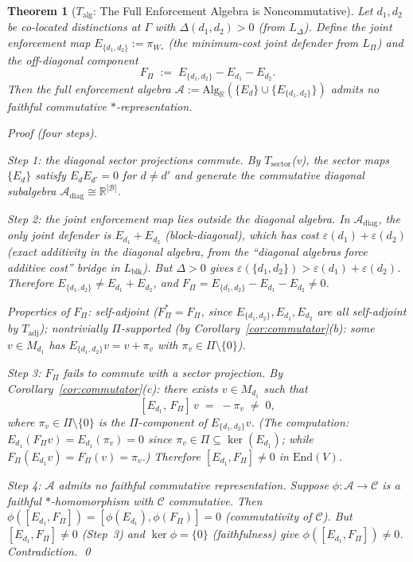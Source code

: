 \documentclass[11pt,a4paper]{article}
\newtheorem{theorem}{Theorem}[section]
\theoremstyle{definition}
\newcommand{\eps}{\varepsilon}
\newcommand{\End}{\mathrm{End}}
\begin{document}
\begin{theorem}[$T_{\mathrm{alg}}$: The Full Enforcement Algebra is Noncommutative]\label{thm:Talg}
Let $d_1, d_2$ be co-located distinctions at $\Gamma$ with $\Delta(d_1, d_2) > 0$ (from $L_\Delta$).  Define the \emph{joint enforcement map} $E_{\{d_1,d_2\}} := \pi_{W_*}$ (the minimum-cost joint defender from $L_\Pi$) and the \emph{off-diagonal component}
\[
F_\Pi \;:=\; E_{\{d_1,d_2\}} - E_{d_1} - E_{d_2}.
\]
Then the full enforcement algebra $\mathcal{A} := \mathrm{Alg}_\mathbb{R}(\{E_d\} \cup \{E_{\{d_1,d_2\}}\})$ admits no faithful commutative $*$-representation.

\smallskip\noindent\textit{Proof} (four steps).

\textit{Step 1: the diagonal sector projections commute.}
By $T_{\mathrm{sector}}$(v), the sector maps $\{E_d\}$ satisfy $E_d E_{d'} = 0$ for $d \ne d'$ and generate the commutative diagonal subalgebra $\mathcal{A}_{\mathrm{diag}} \cong \mathbb{R}^{|\mathcal{B}|}$.

\textit{Step 2: the joint enforcement map lies outside the diagonal algebra.}
In $\mathcal{A}_{\mathrm{diag}}$, the only joint defender is $E_{d_1} + E_{d_2}$ (block-diagonal), which has cost $\eps(d_1) + \eps(d_2)$ (exact additivity in the diagonal algebra, from the ``diagonal algebras force additive cost'' bridge in $L_{\mathrm{blk}}$).  But $\Delta > 0$ gives $\eps(\{d_1,d_2\}) > \eps(d_1) + \eps(d_2)$.  Therefore $E_{\{d_1,d_2\}} \ne E_{d_1} + E_{d_2}$, and $F_\Pi = E_{\{d_1,d_2\}} - E_{d_1} - E_{d_2} \ne 0$.

Properties of $F_\Pi$: self-adjoint ($F_\Pi^* = F_\Pi$, since $E_{\{d_1,d_2\}}, E_{d_1}, E_{d_2}$ are all self-adjoint by $T_{\mathrm{adj}}$); nontrivially $\Pi$-supported (by Corollary~\ref{cor:commutator}(b): some $v \in M_{d_1}$ has $E_{\{d_1,d_2\}}v = v + \pi_v$ with $\pi_v \in \Pi \setminus \{0\}$).

\textit{Step 3: $F_\Pi$ fails to commute with a sector projection.}
By Corollary~\ref{cor:commutator}(c): there exists $v \in M_{d_1}$ such that
\[
[E_{d_1},\, F_\Pi]\,v \;=\; -\pi_v \;\ne\; 0,
\]
where $\pi_v \in \Pi \setminus \{0\}$ is the $\Pi$-component of $E_{\{d_1,d_2\}}v$.  (The computation: $E_{d_1}(F_\Pi v) = E_{d_1}(\pi_v) = 0$ since $\pi_v \in \Pi \subseteq \ker(E_{d_1})$; while $F_\Pi(E_{d_1}v) = F_\Pi(v) = \pi_v$.)  Therefore $[E_{d_1}, F_\Pi] \ne 0$ in $\End(V)$.

\textit{Step 4: $\mathcal{A}$ admits no faithful commutative representation.}
Suppose $\phi: \mathcal{A} \to \mathcal{C}$ is a faithful $*$-homomorphism with $\mathcal{C}$ commutative.  Then $\phi([E_{d_1}, F_\Pi]) = [\phi(E_{d_1}), \phi(F_\Pi)] = 0$ (commutativity of $\mathcal{C}$).  But $[E_{d_1}, F_\Pi] \ne 0$ (Step~3) and $\ker\phi = \{0\}$ (faithfulness) give $\phi([E_{d_1}, F_\Pi]) \ne 0$.  Contradiction.  \qed


\end{theorem}
\end{document}
